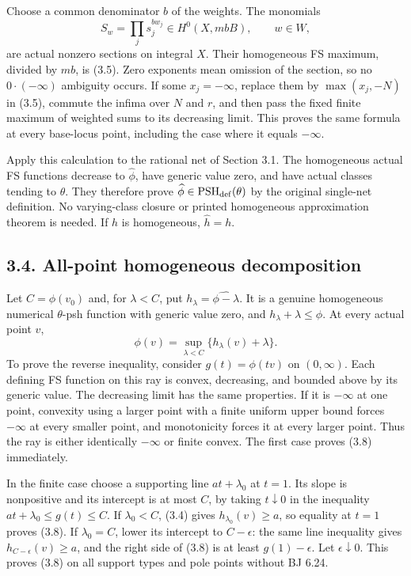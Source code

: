 \documentclass[
  10pt,
]{article}
\begin{document}
Choose a common denominator \(b\) of the weights. The monomials
\[S_w=\prod_j s_j^{bw_j}\in H^0(X,mbB),\qquad w\in W,\tag{3.7}\] are
actual nonzero sections on integral \(X\). Their homogeneous FS maximum,
divided by \(mb\), is (3.5). Zero exponents mean omission of the
section, so no \(0\cdot(-\infty)\) ambiguity occurs. If some
\(x_j=-\infty\), replace them by \(\max(x_j,-N)\) in (3.5), commute the
infima over \(N\) and \(r\), and then pass the fixed finite maximum of
weighted sums to its decreasing limit. This proves the same formula at
every base-locus point, including the case where it equals \(-\infty\).

Apply this calculation to the rational net of Section 3.1. The
homogeneous actual FS functions decrease to \(\widehat\phi\), have
generic value zero, and have actual classes tending to \(\theta\). They
therefore prove \(\widehat\phi\in\operatorname{PSH}_{\rm def}(\theta)\)
by the original single-net definition. No varying-class closure or
printed homogeneous approximation theorem is needed. If \(h\) is
homogeneous, \(\widehat h=h\).

\subsection{3.4. All-point homogeneous
decomposition}\label{all-point-homogeneous-decomposition}

Let \(C=\phi(v_0)\) and, for \(\lambda<C\), put
\(h_\lambda=\widehat{\phi-\lambda}\). It is a genuine homogeneous
numerical \(\theta\)-psh function with generic value zero, and
\(h_\lambda+\lambda\leq\phi\). At every actual point \(v\),
\[\phi(v)=\sup_{\lambda<C}\{h_\lambda(v)+\lambda\}.\tag{3.8}\] To prove
the reverse inequality, consider \(g(t)=\phi(tv)\) on \((0,\infty)\).
Each defining FS function on this ray is convex, decreasing, and bounded
above by its generic value. The decreasing limit has the same
properties. If it is \(-\infty\) at one point, convexity using a larger
point with a finite uniform upper bound forces \(-\infty\) at every
smaller point, and monotonicity forces it at every larger point. Thus
the ray is either identically \(-\infty\) or finite convex. The first
case proves (3.8) immediately.

In the finite case choose a supporting line \(at+\lambda_0\) at \(t=1\).
Its slope is nonpositive and its intercept is at most \(C\), by taking
\(t\downarrow0\) in the inequality \(at+\lambda_0\leq g(t)\leq C\). If
\(\lambda_0<C\), (3.4) gives \(h_{\lambda_0}(v)\geq a\), so equality at
\(t=1\) proves (3.8). If \(\lambda_0=C\), lower its intercept to
\(C-\epsilon\): the same line inequality gives
\(h_{C-\epsilon}(v)\geq a\), and the right side of (3.8) is at least
\(g(1)-\epsilon\). Let \(\epsilon\downarrow0\). This proves (3.8) on all
support types and pole points without BJ 6.24.
\end{document}
